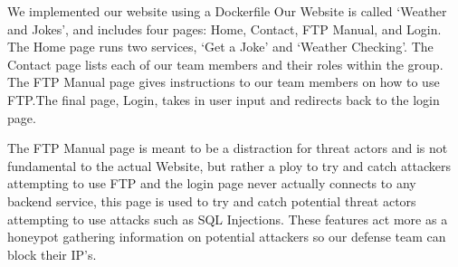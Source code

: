 
We implemented our website using a Dockerfile Our Website is called ‘Weather and Jokes’, and includes four pages: Home, Contact, FTP Manual, and Login. The Home page runs two services, ‘Get a Joke’ and ‘Weather Checking’. The Contact page lists each of our team members and their roles within the group. The FTP Manual page gives instructions to our team members on how to use FTP.The final page, Login, takes in user input and redirects back to the login page. 

The FTP Manual page is meant to be a distraction for threat actors and is not fundamental to the actual Website, but rather a ploy to try and catch attackers attempting to use FTP and the login page never actually connects to any backend service, this page is used to try and catch potential threat actors attempting to use attacks such as SQL Injections. These features act more as a honeypot gathering information on potential attackers so our defense team can block their IP's. 
